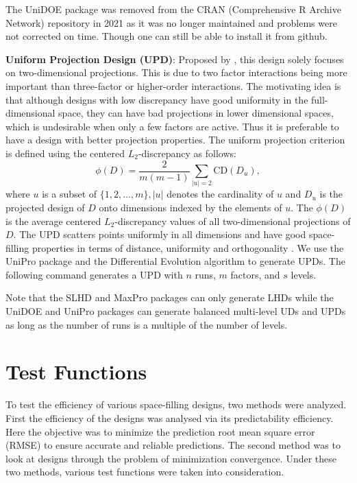 \documentclass [PhD] {package/uclathes}
\begin{document}
The UniDOE package was removed from the CRAN (Comprehensive R Archive Network) repository in 2021 as it was no longer maintained and problems were not corrected on time. Though one can still be able to install it from github.

\textbf{Uniform Projection Design (UPD)}:
Proposed by \textcite{sun2019uniform}, this design solely focuses on  two-dimensional projections. This is due to two factor interactions being more important than three-factor or higher-order interactions. The motivating idea is that although designs with low discrepancy have good uniformity in the full-dimensional space, they can have bad projections in lower dimensional spaces, which is undesirable when only a few factors are active. Thus it is preferable to have a design with better projection properties. The uniform projection criterion is defined using the centered $L_2$-discrepancy as follows:
\begin{equation}\label{eqn:UniPro}
  \phi(D)=\frac{2}{m(m-1)} \sum_{|u|=2} \mathrm{CD}\left(D_u\right),
\end{equation}
where $u$ is a subset of $\{1,2, \ldots, m\},|u|$ denotes the cardinality of $u$ and $D_u$ is the projected design of $D$ onto dimensions indexed by the elements of $u$. The $\phi(D)$ is the average centered $L_2$-discrepancy values of all two-dimensional projections of $D$. The UPD scatters points uniformly in all dimensions and have good space-filling properties in terms of distance, uniformity and orthogonality \parencite{sun2019uniform}. We use the UniPro package and the Differential Evolution algorithm to generate UPDs. The following command generates a UPD with $n$ runs, $m$ factors, and $s$ levels.
\begin{Schunk}
\end{Schunk}
Note that the SLHD and MaxPro packages can only generate LHDs while the UniDOE and UniPro packages can generate balanced multi-level UDs and UPDs as long as the number of runs is a multiple of the number of levels.

\section{Test Functions}
To test the efficiency of various space-filling designs, two methods were analyzed. First the efficiency of the designs was analysed via its predictability efficiency. Here the objective was  to minimize the prediction root mean square error (RMSE) to ensure accurate and reliable predictions. The second method was to look at designs through the problem of minimization convergence. Under these two methods, various test functions were taken into consideration.
\end{document}
